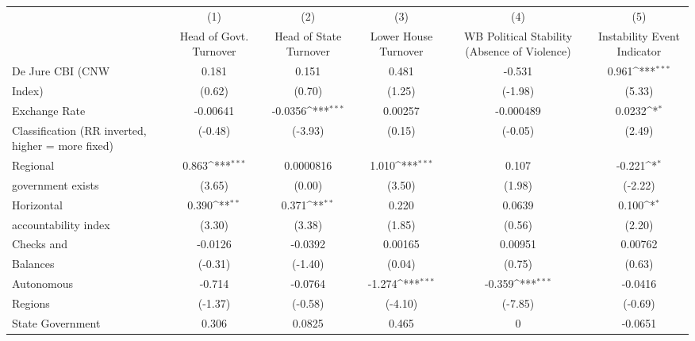 {
\def\sym#1{\ifmmode^{#1}\else\(^{#1}\)\fi}
\begin{tabular}{l*{5}{c}}
\toprule
                &\multicolumn{1}{c}{(1)}&\multicolumn{1}{c}{(2)}&\multicolumn{1}{c}{(3)}&\multicolumn{1}{c}{(4)}&\multicolumn{1}{c}{(5)}\\
                &\multicolumn{1}{c}{Head of Govt. Turnover}&\multicolumn{1}{c}{Head of State Turnover}&\multicolumn{1}{c}{Lower House Turnover}&\multicolumn{1}{c}{WB Political Stability (Absence of Violence)}&\multicolumn{1}{c}{Instability Event Indicator}\\
\midrule
De Jure CBI (CNW&    0.181         &    0.151         &    0.481         &   -0.531         &    0.961\sym{***}\\
Index)          &   (0.62)         &   (0.70)         &   (1.25)         &  (-1.98)         &   (5.33)         \\
\addlinespace
Exchange Rate   & -0.00641         &  -0.0356\sym{***}&  0.00257         &-0.000489         &   0.0232\sym{*}  \\
Classification (RR inverted, higher = more fixed)&  (-0.48)         &  (-3.93)         &   (0.15)         &  (-0.05)         &   (2.49)         \\
\addlinespace
Regional        &    0.863\sym{***}&0.0000816         &    1.010\sym{***}&    0.107         &   -0.221\sym{*}  \\
government exists   &   (3.65)         &   (0.00)         &   (3.50)         &   (1.98)         &  (-2.22)         \\
\addlinespace
Horizontal      &    0.390\sym{**} &    0.371\sym{**} &    0.220         &   0.0639         &    0.100\sym{*}  \\
accountability index&   (3.30)         &   (3.38)         &   (1.85)         &   (0.56)         &   (2.20)         \\
\addlinespace
Checks and      &  -0.0126         &  -0.0392         &  0.00165         &  0.00951         &  0.00762         \\
Balances        &  (-0.31)         &  (-1.40)         &   (0.04)         &   (0.75)         &   (0.63)         \\
\addlinespace
Autonomous      &   -0.714         &  -0.0764         &   -1.274\sym{***}&   -0.359\sym{***}&  -0.0416         \\
Regions         &  (-1.37)         &  (-0.58)         &  (-4.10)         &  (-7.85)         &  (-0.69)         \\
\addlinespace
State Government&    0.306         &   0.0825         &    0.465         &        0         &  -0.0651         \\

\end{tabular}}
